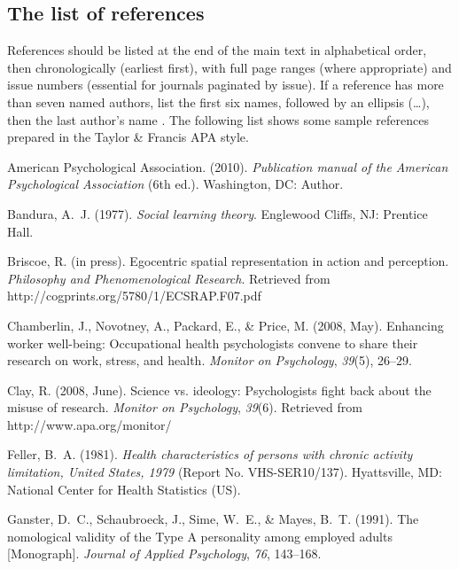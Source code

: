 \documentclass[]{interact}
\theoremstyle{plain}%
\theoremstyle{definition}
\theoremstyle{remark}
\begin{document}
\subsection{The list of references}

References should be listed at the end of the main text in alphabetical order, then chronologically (earliest first), with full page ranges (where appropriate) and issue numbers (essential for journals paginated by issue). If a reference has more than seven named authors, list the first six names, followed by an ellipsis (\ldots), then the last author's name \cite[see for example][]{Gil04}.
The following list shows some sample references prepared in the Taylor \& Francis APA style.

\begin{thebibliography}{}

American Psychological Association. (2010). \emph {Publication manual of the
 American Psychological Association} (6th ed.). Washington, DC: Author.

Bandura, A.~J. (1977). \emph{Social learning theory}. Englewood Cliffs, NJ:
 Prentice Hall.

Briscoe, R. (in press). {Egocentric spatial representation in action and
 perception}. \emph{Philosophy and Phenomenological Research}. Retrieved from
 http://cogprints.org/5780/1/ECSRAP.F07.pdf

Chamberlin, J., Novotney, A., Packard, E., \& Price, M. (2008, May).
 Enhancing worker well-being: Occupational health psychologists convene to
 share their research on work, stress, and health. \emph{Monitor on
 Psychology}, \emph{39}(5), 26--29.

Clay, R. (2008, June). Science vs. ideology: Psychologists fight back about the
 misuse of research. \emph{Monitor on Psychology}, \emph{39}(6). Retrieved from
 http://www.apa.org/monitor/

Feller, B.~A. (1981). \emph{Health characteristics of persons with chronic
 activity limitation, United States, 1979} (Report No. VHS-SER10/137).
 Hyattsville, MD: National Center for Health Statistics (US).

Ganster, D.~C., Schaubroeck, J., Sime, W.~E., \& Mayes, B.~T. (1991).
 The nomological validity of the Type A personality among employed adults
 [Monograph]. \emph{Journal of Applied Psychology}, \emph{76}, 143--168.


\end{thebibliography}
\end{document}
